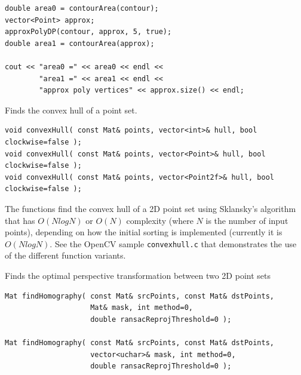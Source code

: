 \begin{description}
\begin{lstlisting}
double area0 = contourArea(contour);
vector<Point> approx;
approxPolyDP(contour, approx, 5, true);
double area1 = contourArea(approx);

cout << "area0 =" << area0 << endl <<
        "area1 =" << area1 << endl <<
        "approx poly vertices" << approx.size() << endl; 
\end{lstlisting}

Finds the convex hull of a point set.

\begin{lstlisting}
void convexHull( const Mat& points, vector<int>& hull, bool clockwise=false );
void convexHull( const Mat& points, vector<Point>& hull, bool clockwise=false );
void convexHull( const Mat& points, vector<Point2f>& hull, bool clockwise=false );
\end{lstlisting}
\begin{description}
\end{description}

The functions find the convex hull of a 2D point set using Sklansky's algorithm \cite{Sklansky82} that has $O(N logN)$ or $O(N)$ complexity (where $N$ is the number of input points), depending on how the initial sorting is implemented (currently it is $O(N logN)$. See the OpenCV sample \texttt{convexhull.c} that demonstrates the use of the different function variants. 

\label{findHomography}
Finds the optimal perspective transformation between two 2D point sets

\begin{lstlisting}
Mat findHomography( const Mat& srcPoints, const Mat& dstPoints,
                    Mat& mask, int method=0,
                    double ransacReprojThreshold=0 );
    
Mat findHomography( const Mat& srcPoints, const Mat& dstPoints,
                    vector<uchar>& mask, int method=0,
                    double ransacReprojThreshold=0 );


\end{lstlisting}
\end{description}
